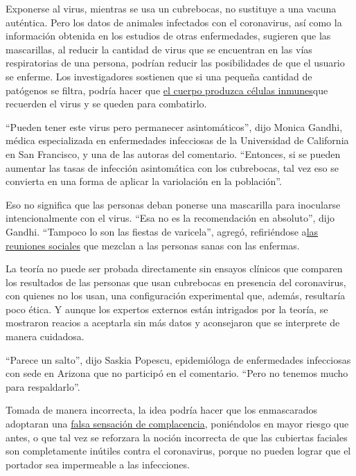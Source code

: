 Exponerse al virus, mientras se usa un cubrebocas, no sustituye a una
vacuna auténtica. Pero los datos de animales infectados con el
coronavirus, así como la información obtenida en los estudios de otras
enfermedades, sugieren que las mascarillas, al reducir la cantidad de
virus que se encuentran en las vías respiratorias de una persona,
podrían reducir las posibilidades de que el usuario se enferme. Los
investigadores sostienen que si una pequeña cantidad de patógenos se
filtra, podría hacer que
\href{https://www.nytimes3xbfgragh.onion/es/interactive/2020/03/13/science/coronavirus-celulas-sintomas.html}{el
cuerpo produzca células inmunes}que recuerden el virus y se queden para
combatirlo.

``Pueden tener este virus pero permanecer asintomáticos'', dijo Monica
Gandhi, médica especializada en enfermedades infecciosas de la
Universidad de California en San Francisco, y una de las autoras del
comentario. ``Entonces, si se pueden aumentar las tasas de infección
asintomática con los cubrebocas, tal vez eso se convierta en una forma
de aplicar la variolación en la población''.

Eso no significa que las personas deban ponerse una mascarilla para
inocularse intencionalmente con el virus. ``Esa no es la recomendación
en absoluto'', dijo Gandhi. ``Tampoco lo son las fiestas de varicela'',
agregó, refiriéndose
a\href{https://www.nytimes3xbfgragh.onion/es/2020/07/13/espanol/mundo/fiesta-covid.html}{las
reuniones sociales} que mezclan a las personas sanas con las enfermas.

La teoría no puede ser probada directamente sin ensayos clínicos que
comparen los resultados de las personas que usan cubrebocas en presencia
del coronavirus, con quienes no los usan, una configuración experimental
que, además, resultaría poco ética. Y aunque los expertos externos están
intrigados por la teoría, se mostraron reacios a aceptarla sin más datos
y aconsejaron que se interprete de manera cuidadosa.

``Parece un salto'', dijo Saskia Popescu, epidemióloga de enfermedades
infecciosas con sede en Arizona que no participó en el comentario.
``Pero no tenemos mucho para respaldarlo''.

Tomada de manera incorrecta, la idea podría hacer que los enmascarados
adoptaran una
\href{https://www.nytimes3xbfgragh.onion/es/2020/03/24/espanol/ciencia-y-tecnologia/coronavirus-panico.html}{falsa
sensación de complacencia}, poniéndolos en mayor riesgo que antes, o que
tal vez se reforzara la noción incorrecta de que las cubiertas faciales
son completamente inútiles contra el coronavirus, porque no pueden
lograr que el portador sea impermeable a las infecciones.

